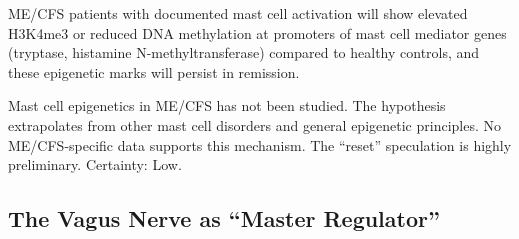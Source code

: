 \begin{prediction}
\label{pred:mast-memory}
ME/CFS patients with documented mast cell activation will show elevated H3K4me3 or reduced DNA methylation at promoters of mast cell mediator genes (tryptase, histamine N-methyltransferase) compared to healthy controls, and these epigenetic marks will persist in remission.
\end{prediction}

\begin{warning}
Mast cell epigenetics in ME/CFS has not been studied. The hypothesis extrapolates from other mast cell disorders and general epigenetic principles. No ME/CFS-specific data supports this mechanism. The ``reset'' speculation is highly preliminary. Certainty: Low.
\end{warning}

\subsection{The Vagus Nerve as ``Master Regulator''}
\label{sec:vagus-hub}

